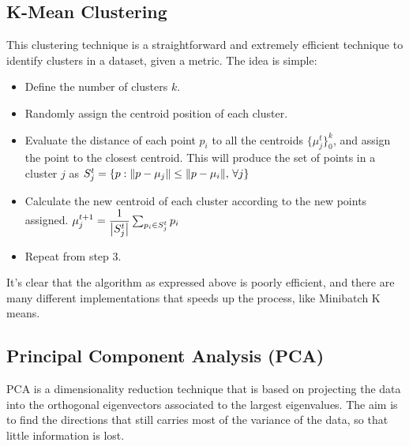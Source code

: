 \documentclass[12pt,a4paper]{article}
\begin{document}
\subsection{K-Mean Clustering}
This clustering technique is a straightforward and extremely efficient technique to identify clusters in a dataset, given a metric.
The idea is simple:
\begin{itemize}
	\item[1.] Define the number of clusters $k$.
	\item[2.] Randomly assign the centroid position of each cluster.
	\item[3.] Evaluate the distance of each point $p_i$ to all the centroids $\{\mu_j^t\}_0^k$, and assign the point to the closest centroid. This will produce the set of points in a cluster $j$ as $S_j^t = \{p : \norm{p-\mu_j} \leq \norm{p-\mu_i},\, \forall j\}$
	\item[4.] Calculate the new centroid of each cluster according to the new points assigned. $\mu_j^{t+1} = \dfrac{1}{\abs{S_j^t}} \sum_{p_i\in S_j^t}p_i$
	\item[5.] Repeat from step 3.
\end{itemize}

It's clear that the algorithm as expressed above is poorly efficient, and there are many different implementations that speeds up the process, like Minibatch K means.

\subsection{Principal Component Analysis (PCA)}
PCA is a dimensionality reduction technique that is based on projecting the data into the orthogonal eigenvectors associated to the largest eigenvalues. The aim is to find the directions that still carries most of the variance of the data, so that little information is lost.
\end{document}
